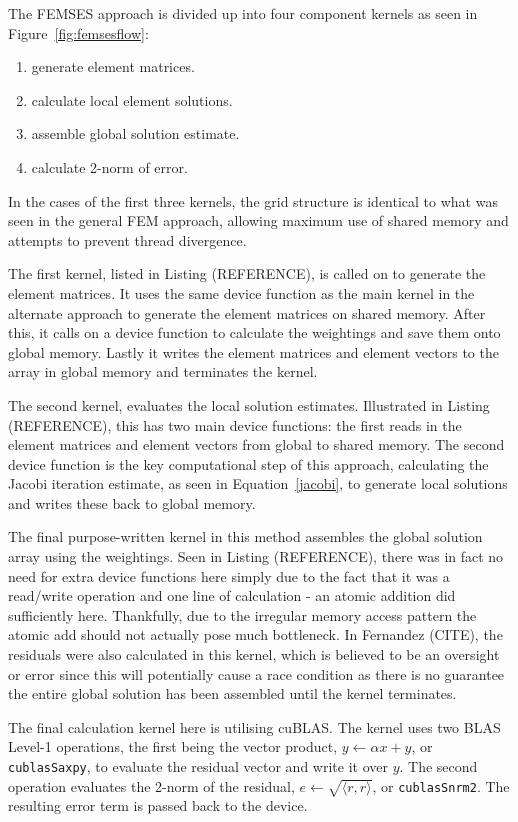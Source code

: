 The FEMSES approach is divided up into four component kernels as seen in Figure~\ref{fig:femsesflow}:
\begin{enumerate}
	\item generate element matrices.
	\item calculate local element solutions.
	\item assemble global solution estimate.
	\item calculate 2-norm of error.
\end{enumerate}
In the cases of the first three kernels, the grid structure is identical to what was seen in the general FEM approach, allowing maximum use of shared memory and attempts to prevent thread divergence.

The first kernel, listed in Listing (REFERENCE), is called on to generate the element matrices. It uses the same device function as the main kernel in the alternate approach to generate the element matrices on shared memory. After this, it calls on a device function to calculate the weightings and save them onto global memory. Lastly it writes the element matrices and element vectors to the array in global memory and terminates the kernel.

The second kernel, evaluates the local solution estimates. Illustrated in Listing (REFERENCE), this has two main device functions: the first reads in the element matrices and element vectors from global to shared memory. The second device function is the key computational step of this approach, calculating the Jacobi iteration estimate, as seen in Equation~\eqref{jacobi}, to generate local solutions and writes these back to global memory.

The final purpose-written kernel in this method assembles the global solution array using the weightings. Seen in Listing (REFERENCE), there was in fact no need for extra device functions here simply due to the fact that it was a read/write operation and one line of calculation - an atomic addition did sufficiently here. Thankfully, due to the irregular memory access pattern the atomic add should not actually pose much bottleneck. In Fernandez (CITE), the residuals were also calculated in this kernel, which is believed to be an oversight or error since this will potentially cause a race  condition as there is no guarantee the entire global solution has been assembled until the kernel terminates.

The final calculation kernel here is utilising cuBLAS. The kernel uses two BLAS Level-1 operations, the first being the vector product, $y \leftarrow \alpha x + y$, or \texttt{cublasSaxpy}, to evaluate the residual vector and write it over $y$. The second operation evaluates the 2-norm of the residual, $e \leftarrow \sqrt{\langle r, r\rangle}$, or \texttt{cublasSnrm2}. The resulting error term is passed back to the device.

